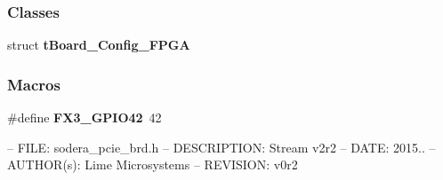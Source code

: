 \subsubsection*{Classes}
\begin{DoxyCompactItemize}
\item 
struct {\bf t\+Board\+\_\+\+Config\+\_\+\+F\+P\+GA}
\end{DoxyCompactItemize}
\subsubsection*{Macros}
\begin{DoxyCompactItemize}
\item 
\#define {\bf F\+X3\+\_\+\+G\+P\+I\+O42}~42
\begin{DoxyCompactList}\small\item\em 

 -- F\+I\+LE\+: sodera\+\_\+pcie\+\_\+brd.\+h -- D\+E\+S\+C\+R\+I\+P\+T\+I\+ON\+: Stream v2r2 -- D\+A\+TE\+: 2015.. -- A\+U\+T\+H\+O\+R(s)\+: Lime Microsystems -- R\+E\+V\+I\+S\+I\+ON\+: v0r2 


\end{DoxyCompactList}
\end{DoxyCompactItemize}
